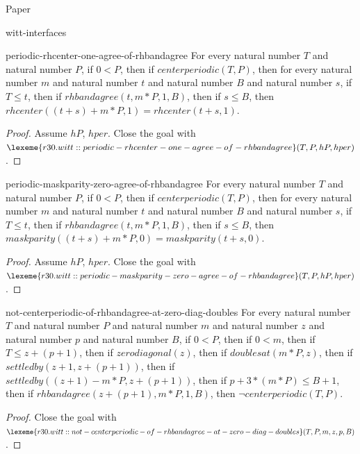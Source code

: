 \begin{lexlean}{Paper}
\begin{section}{witt-interfaces}
  \begin{theorem}{periodic-rhcenter-one-agree-of-rhbandagree}
  For every natural number \(T\) and natural number \(P\), if \(0 < P\), then if \(centerperiodic(T, P)\), then for every natural number \(m\) and natural number \(t\) and natural number \(B\) and natural number \(s\), if \(T ≤ t\), then if \(rhbandagree(t, m * P, 1, B)\), then if \(s ≤ B\), then \(rhcenter((t + s) + m * P, 1) = rhcenter(t + s, 1)\).
  \begin{proof}
  Assume \(hP\), \(hper\).
  Close the goal with \(\lexeme{r30.witt::periodic-rhcenter-one-agree-of-rhbandagree}(T, P, hP, hper)\).
  \end{proof}
  \end{theorem}

  \begin{theorem}{periodic-maskparity-zero-agree-of-rhbandagree}
  For every natural number \(T\) and natural number \(P\), if \(0 < P\), then if \(centerperiodic(T, P)\), then for every natural number \(m\) and natural number \(t\) and natural number \(B\) and natural number \(s\), if \(T ≤ t\), then if \(rhbandagree(t, m * P, 1, B)\), then if \(s ≤ B\), then \(maskparity((t + s) + m * P, 0) = maskparity(t + s, 0)\).
  \begin{proof}
  Assume \(hP\), \(hper\).
  Close the goal with \(\lexeme{r30.witt::periodic-maskparity-zero-agree-of-rhbandagree}(T, P, hP, hper)\).
  \end{proof}
  \end{theorem}

  \begin{theorem}{not-centerperiodic-of-rhbandagree-at-zero-diag-doubles}
  For every natural number \(T\) and natural number \(P\) and natural number \(m\) and natural number \(z\) and natural number \(p\) and natural number \(B\), if \(0 < P\), then if \(0 < m\), then if \(T ≤ z + (p + 1)\), then if \(zerodiagonal(z)\), then if \(doublesat(m * P, z)\), then if \(settledby(z + 1, z + (p + 1))\), then if \(settledby((z + 1) - m * P, z + (p + 1))\), then if \(p + 3 * (m * P) ≤ B + 1\), then if \(rhbandagree(z + (p + 1), m * P, 1, B)\), then \(¬ centerperiodic(T, P)\).
  \begin{proof}
  Close the goal with \(\lexeme{r30.witt::not-centerperiodic-of-rhbandagree-at-zero-diag-doubles}(T, P, m, z, p, B)\).
  \end{proof}
  \end{theorem}


\end{section}
\end{lexlean}
